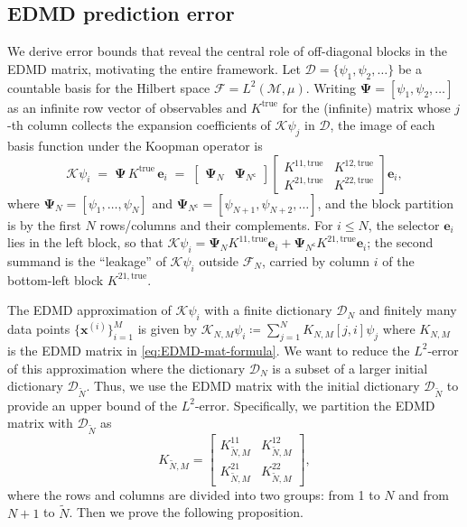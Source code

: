 \documentclass{article}
\theoremstyle{plain}
\theoremstyle{definition}
\def\x{\mathbf{x}}
\def\Koop{\mathcal{K}}
\def\Fc{\mathcal{F}}
\def\Dc{\mathcal{D}}
\def\Mc{\mathcal{M}}
\begin{document}
	\subsection{EDMD prediction error}\label{subsec:error-bounds}
		\vspace{-0.2cm}
	We derive error bounds that reveal the central role of off-diagonal blocks in the EDMD matrix, motivating the entire framework. Let $\Dc = \{\psi_1, \psi_2, \ldots\}$ be a countable basis for the Hilbert space $\Fc = L^2(\Mc, \mu)$. 
	Writing $\mathbf{\Psi} = [\psi_1, \psi_2, \ldots]$ as an infinite row vector of observables and $K^{\text{true}}$ for the (infinite) matrix whose $j$-th column collects the expansion coefficients of $\Koop\psi_j$ in $\Dc$, the image of each basis function under the Koopman operator is
	\begin{equation}\label{eq:psi_evolve_true}
		\Koop\psi_i
		\;=\;
		\mathbf{\Psi}\, K^{\text{true}}\, \mathbf{e}_i
		\;=\;
		\begin{bmatrix}
			\mathbf{\Psi}_N & \mathbf{\Psi}_{N^\mathsf{c}}
		\end{bmatrix}
		\begin{bmatrix}
			K^{11, \text{true}} & K^{12, \text{true}} \\
			K^{21, \text{true}} & K^{22, \text{true}}
		\end{bmatrix}
		\mathbf{e}_i,
	\end{equation}
	where $\mathbf{\Psi}_N = [\psi_1,\ldots,\psi_N]$ and $\mathbf{\Psi}_{N^\mathsf{c}} = [\psi_{N+1},\psi_{N+2},\ldots]$, and the block partition is by the first $N$ rows/columns and their complements. For $i \leq N$, the selector $\mathbf{e}_i$ lies in the left block, so that $\Koop\psi_i = \mathbf{\Psi}_N K^{11,\text{true}}\mathbf{e}_i + \mathbf{\Psi}_{N^\mathsf{c}} K^{21,\text{true}}\mathbf{e}_i$; the second summand is the ``leakage'' of $\Koop\psi_i$ outside $\Fc_N$, carried by column $i$ of the bottom-left block $K^{21,\text{true}}$. 
	
	The EDMD approximation of $\Koop\psi_i$ with a finite dictionary $\Dc_N$ and finitely many data points $\{\x^{(i)}\}_{i=1}^M$ is given by $\Koop_{N,M}\psi_i \coloneqq \sum_{j=1}^N K_{N,M}[j,i]\psi_j$ where $K_{N,M}$ is the EDMD matrix in \eqref{eq:EDMD-mat-formula}. We want to reduce the $L^2$-error of this approximation where the dictionary $\Dc_N$ is a subset of a larger initial dictionary $\Dc_{\tilde{N}}$. Thus, we use the EDMD matrix with the initial dictionary $\Dc_{\tilde{N}}$ to provide an upper bound of the $L^2$-error. Specifically, we partition the EDMD matrix with $\Dc_{\tilde{N}}$ as 
	\begin{equation}\label{eq:K-block}
		K_{\tilde{N},M} = \begin{bmatrix} K_{\tilde{N},M}^{11} & K_{\tilde{N},M}^{12} \\ K_{\tilde{N},M}^{21} & K_{\tilde{N},M}^{22} \end{bmatrix},
	\end{equation}
	where the rows and columns are divided into two groups: from 1 to $N$ and from $N+1$ to $\tilde{N}$. Then we prove the following proposition. 	
	
\end{document}
